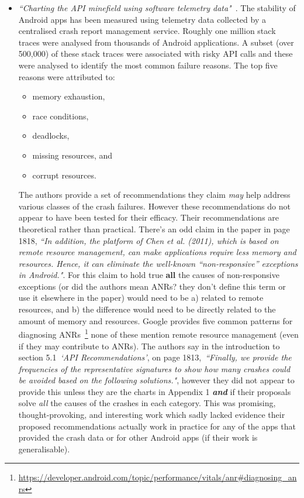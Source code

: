 \begin{itemize}
    \item \emph{``Charting the API minefield using software telemetry data"}~\citep{Kechagia2015_charting_API_minefield_using_telemetry_data}. The stability of Android apps has been measured using telemetry data collected by a centralised crash report management service. Roughly one million stack traces were analysed from thousands of Android applications. A subset (over 500,000) of these stack traces were associated with risky API calls and these were analysed to identify the most common failure reasons. The top five reasons were attributed to:
    \begin{itemize}
        \item memory exhaustion,
        \item race conditions,
        \item deadlocks,
        \item missing resources, and
        \item corrupt resources.
    \end{itemize}
    The authors provide a set of recommendations they claim \emph{may} help address various classes of the crash failures. However these recommendations do not appear to have been tested for their efficacy. Their recommendations are theoretical rather than practical. There's an odd claim in the paper in page 1818, \emph{``In addition, the platform of Chen et al. (2011), which is based on remote resource management, can make applications require less memory and resources. Hence, it can eliminate the well-known “non-responsive” exceptions in Android."}. For this claim to hold true \textbf{all} the causes of non-responsive exceptions (or did the authors mean ANRs? they don't define this term or use it elsewhere in the paper) would need to be a) related to remote resources, and b) the difference would need to be directly related to the amount of memory and resources. Google provides five common patterns for diagnosing ANRs~\footnote{\url{https://developer.android.com/topic/performance/vitals/anr\#diagnosing_anrs}} none of these mention remote resource management (even if they may contribute to ANRs). The authors say in the introduction to section 5.1~\emph{`API Recommendations'}, on page 1813,~\emph{``Finally, we provide the frequencies of the representative signatures to show how many crashes could be avoided based on the following solutions."}, however they did not appear to provide this unless they are the charts in  Appendix 1 \textbf{\textit{and}} if their proposals solve \textit{all} the causes of the crashes in each category. This was promising, thought-provoking, and interesting work which sadly lacked evidence their proposed recommendations actually work in practice for any of the apps that provided the crash data or for other Android apps (if their work is generalisable).


\end{itemize}
